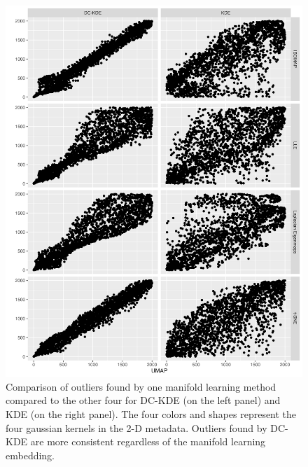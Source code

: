 \documentclass[11pt,a4paper,]{article}
\begin{document}
\begin{figure}

{\centering \includegraphics[width=0.95\linewidth]{figures/Twin Peak2000_density_compare_umapvs4ml_radius8_r0_5_rank} 

}

\caption{Comparison of outliers found by one manifold learning method compared to the other four for DC-KDE (on the left panel) and KDE (on the right panel). The four colors and shapes represent the four gaussian kernels in the 2-D metadata. Outliers found by DC-KDE are more consistent regardless of the manifold learning embedding.}\label{fig:tpllevs4ml-4}
\end{figure}

\printbibliography
\end{document}
